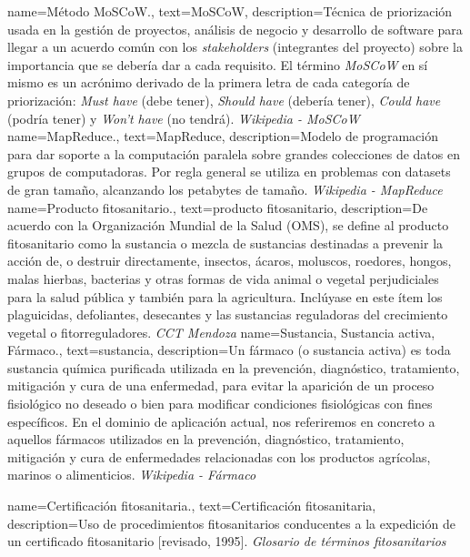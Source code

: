{
    name={Método MoSCoW.},
    text={MoSCoW},
    description={Técnica de priorización usada en la gestión de proyectos, análisis de negocio y desarrollo de software para llegar a un acuerdo común con los \textit{stakeholders} (integrantes del proyecto) sobre la importancia que se debería dar a cada requisito. El término \textit{MoSCoW} en sí mismo es un acrónimo derivado de la primera letra de cada categoría de priorización: \textit{Must have} (debe tener), \textit{Should have} (debería tener), \textit{Could have} (podría tener) y \textit{Won't have} (no tendrá). \textit{Wikipedia - MoSCoW} \cite{wikimoscow}}
}
{
    name={MapReduce.},
    text={MapReduce},
    description={Modelo de programación para dar soporte a la computación paralela sobre grandes colecciones de datos en grupos de computadoras. Por regla general se utiliza en problemas con datasets de gran tamaño, alcanzando los petabytes de tamaño. \textit{Wikipedia - MapReduce} \cite{wikimapreduce}}
}
{
    name={Producto fitosanitario.},
    text={producto fitosanitario},
    description={De acuerdo con la Organización Mundial de la Salud (OMS), se define al producto fitosanitario como la \gls{sustancia} o mezcla de sustancias destinadas a prevenir la acción de, o destruir directamente, insectos, ácaros, moluscos, roedores, hongos, malas hierbas, bacterias y otras formas de vida animal o vegetal perjudiciales para la salud pública y también para la agricultura. Inclúyase en este ítem los plaguicidas, defoliantes, desecantes y las sustancias reguladoras del crecimiento vegetal o fitorreguladores. \textit{CCT Mendoza} \cite{cricyt}}
}
{
    name={Sustancia, Sustancia activa, Fármaco.},
    text={sustancia},
    description={Un fármaco (o sustancia activa) es toda sustancia química purificada utilizada en la prevención, diagnóstico, tratamiento, mitigación y cura de una enfermedad, para evitar la aparición de un proceso fisiológico no deseado o bien para modificar condiciones fisiológicas con fines específicos. En el dominio de aplicación actual, nos referiremos en concreto a aquellos fármacos utilizados en la prevención, diagnóstico, tratamiento, mitigación y cura de enfermedades relacionadas con los productos agrícolas, marinos o alimenticios. \textit{Wikipedia - Fármaco} \cite{farmacowiki}}
}

{
    name={Certificación fitosanitaria.},
    text={Certificación fitosanitaria},
    description={Uso de procedimientos fitosanitarios conducentes a la expedición de un certificado fitosanitario [revisado, 1995]. \textit{Glosario de términos fitosanitarios} \cite{glosarioterminosfito}}
}

